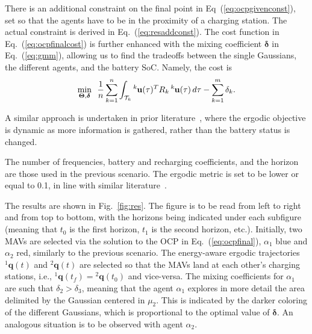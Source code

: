 \documentclass[letterpaper,10pt,conference,twoside]{IEEEtran}
\theoremstyle{definition}
\begin{document}
There is an additional constraint on the final point in Eq~(\ref{eq:ocpgivenconst}), set so that the agents have to be in the proximity of a charging station. The actual constraint is derived in Eq.~(\ref{eq:resaddconst}). %
%
The cost function in Eq.~(\ref{eq:ocpfinalcost}) is further enhanced with the mixing coefficient $\boldsymbol{\delta}$ in Eq.~(\ref{eq:gmm}), allowing us to find the tradeoffs between the single Gaussians, the different agents, and the battery SoC. Namely, the cost is
\begin{equation}
  \min_{\boldsymbol{\Theta},\boldsymbol{\delta}}\,\,\,{\frac{1}{n}\sum_{k=1}^{n}\int_{\mathcal{T}_k}{}^k\hspace*{-.1ex}\mathbf{u}(\tau)^TR_k\,{}^k\hspace*{-.1ex}\mathbf{u}(\tau)\,d\tau-\sum_{k=1}^{m}\delta_k}.
\end{equation}

A similar approach is undertaken in prior literature~\cite{rao2023multi}, where the ergodic objective is dynamic as more information is gathered, rather than the battery status is changed.

The number of frequencies, battery and recharging coefficients, and the horizon are those used in the previous scenario.
The ergodic metric %
is set to be lower or equal to 0.1, %
in line with similar literature~\cite{dong2023time}.

The results are shown in Fig.~\ref{fig:res}. The figure is to be read from left to right and from top to bottom, with the horizons being indicated under each subfigure (meaning that $t_0$ is the first horizon, $t_1$ is the second horizon, etc.). Initially, two MAVs are selected via the solution to the OCP in Eq.~(\ref{eq:ocpfinal}), $\alpha_1$ blue and $\alpha_2$ red, similarly to the previous scenario. %
The energy-aware ergodic trajectories ${}^1\mathbf{q}(t)$ and ${}^2\mathbf{q}(t)$ are selected so that the MAVs land at each other's charging stations, i.e., ${}^1\mathbf{q}(t_f)={}^2\mathbf{q}(t_0)$ and vice-versa. The mixing coefficients for $\alpha_1$ are such that $\delta_2>\delta_3$, meaning that the agent $\alpha_1$ explores in more detail the area delimited by the Gaussian centered in $\mu_2$. This is indicated by the darker coloring of the different Gaussians, which is proportional to the optimal value of $\boldsymbol{\delta}$. 
%
An analogous situation is to be observed with agent $\alpha_2$. %
\end{document}

